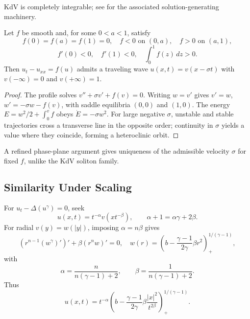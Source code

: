 \begin{remark}
\label{rem:kdv-complete-integrability}
KdV is completely integrable; see \cite{Drazin1983} for the associated
solution-generating machinery.
\end{remark}

\begin{theorem}
\label{thm:bistable-traveling-wave-existence}
Let $f$ be smooth and, for some $0<a<1$, satisfy
\[
f(0)=f(a)=f(1)=0,\quad f<0\text{ on }(0,a),\quad f>0\text{ on }(a,1),
\]
\[
f'(0)<0,\quad f'(1)<0,\quad \int_0^1f(z)\,dz>0.
\]
Then $u_t-u_{xx}=f(u)$ admits a traveling wave
$u(x,t)=v(x-\sigma t)$ with $v(-\infty)=0$ and $v(+\infty)=1$.
\end{theorem}

\begin{proof}
\sketch The profile solves $v''+\sigma v'+f(v)=0$. Writing $w=v'$ gives
$v'=w$, $w'=-\sigma w-f(v)$, with saddle equilibria $(0,0)$ and $(1,0)$.
The energy $E=w^2/2+\int_0^vf$ obeys $\dot E=-\sigma w^2$. For large negative
$\sigma$, unstable and stable trajectories cross a transverse line in the
opposite order; continuity in $\sigma$ yields a value where they coincide,
forming a heteroclinic orbit.
\end{proof}

\begin{remark}
\label{rem:bistable-traveling-wave-velocity-uniqueness}
A refined phase-plane argument gives uniqueness of the admissible velocity
$\sigma$ for fixed $f$, unlike the KdV soliton family.
\end{remark}

\subsection{Similarity Under Scaling}
\label{sec:similarity-under-scaling}

\begin{example}
\label{ex:porous-medium-scaling-invariant-barenblatt}
For $u_t-\Delta(u^\gamma)=0$, seek
\[
u(x,t)=t^{-\alpha}v(xt^{-\beta}),\qquad \alpha+1=\alpha\gamma+2\beta.
\]
For radial $v(y)=w(|y|)$, imposing $\alpha=n\beta$ gives
\[
(r^{n-1}(w^\gamma)')'+\beta(r^nw)'=0,
\quad
w(r)=\left(b-\frac{\gamma-1}{2\gamma}\beta r^2\right)_+^{1/(\gamma-1)},
\]
with
\[
\alpha=\frac n{n(\gamma-1)+2},\qquad
\beta=\frac1{n(\gamma-1)+2}.
\]
Thus
\[
u(x,t)=t^{-\alpha}\left(b-\frac{\gamma-1}{2\gamma}\beta\frac{|x|^2}{t^{2\beta}}\right)_+^{1/(\gamma-1)}.
\]
\end{example}

